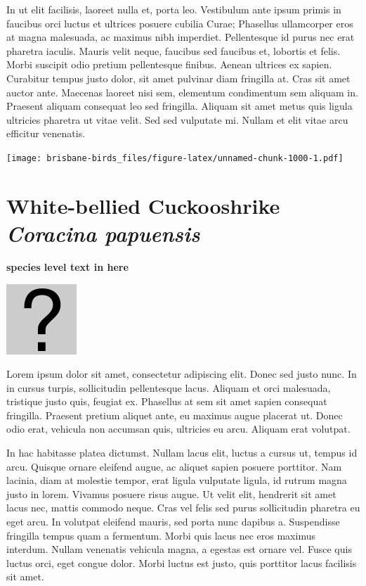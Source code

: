 \documentclass[]{book}
\let\origfigure\figure
\let\endorigfigure\endfigure
\renewenvironment{figure}[1][2] {
  \expandafter\origfigure\expandafter[H]
} {
  \endorigfigure
}
\begin{document}
In ut elit facilisis, laoreet nulla et, porta leo. Vestibulum ante ipsum
primis in faucibus orci luctus et ultrices posuere cubilia Curae;
Phasellus ullamcorper eros at magna malesuada, ac maximus nibh
imperdiet. Pellentesque id purus nec erat pharetra iaculis. Mauris velit
neque, faucibus sed faucibus et, lobortis et felis. Morbi suscipit odio
pretium pellentesque finibus. Aenean ultrices ex sapien. Curabitur
tempus justo dolor, sit amet pulvinar diam fringilla at. Cras sit amet
auctor ante. Maecenas laoreet nisi sem, elementum condimentum sem
aliquam in. Praesent aliquam consequat leo sed fringilla. Aliquam sit
amet metus quis ligula ultricies pharetra ut vitae velit. Sed sed
vulputate mi. Nullam et elit vitae arcu efficitur venenatis.

\begin{figure}
\centering
\texttt{[image: brisbane-birds\_files/figure-latex/unnamed-chunk-1000-1.pdf]}
\caption{\label{fig:unnamed-chunk-1000}insert figure caption}
\end{figure}

\section{\texorpdfstring{White-bellied Cuckooshrike \emph{Coracina
papuensis}}{White-bellied Cuckooshrike Coracina papuensis}}\label{white-bellied-cuckooshrike-coracina-papuensis}

\textbf{species level text in here}

\begin{figure}
\centering
\includegraphics{assets/missing.png}
\caption{No image for species}
\end{figure}

Lorem ipsum dolor sit amet, consectetur adipiscing elit. Donec sed justo
nunc. In in cursus turpis, sollicitudin pellentesque lacus. Aliquam et
orci malesuada, tristique justo quis, feugiat ex. Phasellus at sem sit
amet sapien consequat fringilla. Praesent pretium aliquet ante, eu
maximus augue placerat ut. Donec odio erat, vehicula non accumsan quis,
ultricies eu arcu. Aliquam erat volutpat.

In hac habitasse platea dictumst. Nullam lacus elit, luctus a cursus ut,
tempus id arcu. Quisque ornare eleifend augue, ac aliquet sapien posuere
porttitor. Nam lacinia, diam at molestie tempor, erat ligula vulputate
ligula, id rutrum magna justo in lorem. Vivamus posuere risus augue. Ut
velit elit, hendrerit sit amet lacus nec, mattis commodo neque. Cras vel
felis sed purus sollicitudin pharetra eu eget arcu. In volutpat eleifend
mauris, sed porta nunc dapibus a. Suspendisse fringilla tempus quam a
fermentum. Morbi quis lacus nec eros maximus interdum. Nullam venenatis
vehicula magna, a egestas est ornare vel. Fusce quis luctus orci, eget
congue dolor. Morbi luctus est justo, quis porttitor lacus facilisis sit
amet.
\end{document}

